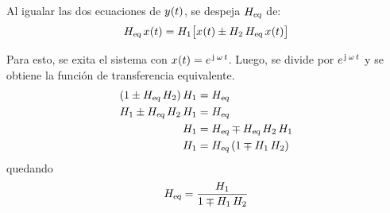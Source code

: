 Al igualar las dos ecuaciones de $\fx[y]{t}$, se despeja $\sub{H}{eq}$ de:
\[
    \sub{H}{eq} \, \fx[x]{t}
    = H_1 \inBrackets{\fx[x]{t} \pm H_2 \, \sub{H}{eq} \, \fx[x]{t}}
\]

Para esto, se exita el sistema con $\fx[x]{t} = e^{\iu \, \omega \, t}$.
Luego, se divide por $e^{\iu \, \omega \, t}$ y se obtiene la función de transferencia equivalente.
\begin{align*}
    \inParentheses{1 \pm \sub{H}{eq} \, H_2} H_1
    & = \sub{H}{eq}
    \\
    H_1 \pm \sub{H}{eq} \, H_2 \, H_1
    & = \sub{H}{eq}
    \\
    H_1
    & = \sub{H}{eq} \mp \sub{H}{eq} \, H_2 \, H_1
    \\
    H_1
    & = \sub{H}{eq} \inParentheses{1 \mp H_1 \, H_2}
\end{align*}
quedando
\[
    \sub{H}{eq} = \frac{H_1}{1 \mp H_1 \, H_2}
\]